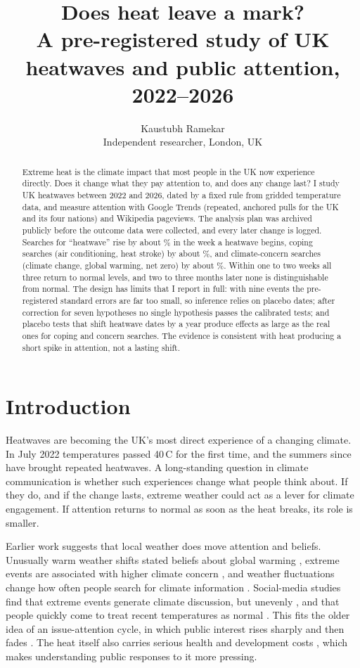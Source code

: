 \documentclass[11pt,a4paper]{article}
\title{Does heat leave a mark?\\[0.3em]
\large A pre-registered study of UK heatwaves and public attention, 2022--2026}
\author{Kaustubh Ramekar\\[0.2em]\small Independent researcher, London, UK}
\date{}
\begin{document}
\maketitle

\begin{abstract}
\noindent
Extreme heat is the climate impact that most people in the UK now experience directly. Does it change what they pay attention to, and does any change last? I study \NEpisodes{} UK heatwaves between 2022 and 2026, dated by a fixed rule from gridded temperature data, and measure attention with Google Trends (repeated, anchored pulls for the UK and its four nations) and Wikipedia pageviews. The analysis plan was archived publicly before the outcome data were collected, and every later change is logged. Searches for ``heatwave'' rise by about \ImpSalPct\% in the week a heatwave begins, coping searches (air conditioning, heat stroke) by about \ImpCopPct\%, and climate-concern searches (climate change, global warming, net zero) by about \ImpConPct\%. Within one to two weeks all three return to normal levels, and two to three months later none is distinguishable from normal. The design has limits that I report in full: with nine events the pre-registered standard errors are far too small, so inference relies on placebo dates; after correction for seven hypotheses no single hypothesis passes the calibrated tests; and placebo tests that shift heatwave dates by a year produce effects as large as the real ones for coping and concern searches. The evidence is consistent with heat producing a short spike in attention, not a lasting shift.
\end{abstract}

\section{Introduction}

Heatwaves are becoming the UK's most direct experience of a changing climate. In July 2022 temperatures passed 40\,\textdegree{}C for the first time, and the summers since have brought repeated heatwaves. A long-standing question in climate communication is whether such experiences change what people think about. If they do, and if the change lasts, extreme weather could act as a lever for climate engagement. If attention returns to normal as soon as the heat breaks, its role is smaller.

Earlier work suggests that local weather does move attention and beliefs. Unusually warm weather shifts stated beliefs about global warming \citep{egan2012}, extreme events are associated with higher climate concern \citep{konisky2016}, and weather fluctuations change how often people search for climate information \citep{lang2014}. Social-media studies find that extreme events generate climate discussion, but unevenly \citep{sisco2017}, and that people quickly come to treat recent temperatures as normal \citep{moore2019}. This fits the older idea of an issue-attention cycle, in which public interest rises sharply and then fades \citep{downs1972}. The heat itself also carries serious health and development costs \citep{debnath2023}, which makes understanding public responses to it more pressing.
\end{document}
